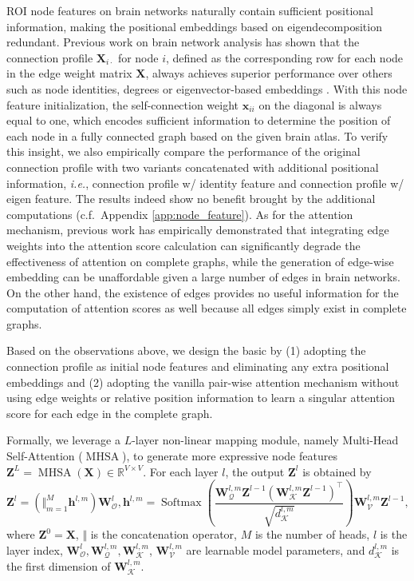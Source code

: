 ROI node features on brain networks naturally contain sufficient positional information, making the positional embeddings based on eigendecomposition redundant. Previous work on brain network analysis has shown that the connection profile $\bm X_{i\cdot}$ for node $i$, defined as the corresponding row for each node in the edge weight matrix $\bm X$, always achieves superior performance over others such as node identities, degrees or eigenvector-based embeddings \citep{li2020braingnn, kan2022fbnetgen, braingb}. With this node feature initialization, the self-connection weight $\bm x_{ii}$ on the diagonal is always equal to one, which encodes sufficient information to determine the position of each node in a fully connected graph based on the given brain atlas.
To verify this insight, we also empirically compare the performance of the original connection profile with two variants concatenated with additional positional information, \textit{i.e.}, connection profile w/ identity feature and connection profile w/ eigen feature. The results indeed show no benefit brought by the additional computations (c.f.~Appendix \ref{app:node_feature}).
As for the attention mechanism, previous work \citep{braingb} has empirically demonstrated that integrating edge weights into the attention score calculation can significantly degrade the effectiveness of attention on complete graphs, while the generation of edge-wise embedding can be unaffordable given a large number of edges in brain networks. On the other hand, the existence of edges provides no useful information for the computation of attention scores as well because all edges simply exist in complete graphs.

Based on the observations above, we design the basic \methodfull by (1) adopting the connection profile as initial node features and eliminating any extra positional embeddings and (2) adopting the vanilla pair-wise attention mechanism without using edge weights or relative position information to learn a singular attention score for each edge in the complete graph.

Formally, we leverage a $L$-layer non-linear mapping module, namely Multi-Head Self-Attention ($\operatorname{MHSA}$), to generate more expressive node features $\bm Z^L = \operatorname{MHSA}(\bm X) \in \mathbb{R}^{V \times V}$. For each layer $l$, the output $\bm Z^{l}$ is obtained by
\begin{equation}
\bm Z^{l} = (\Vert_{m=1}^{M}{\bm h^{l,m}})\bm W^l_{\mathcal{O}},
\text {} \bm h^{l,m} =\operatorname{Softmax}\left(\frac{\bm W_{\mathcal{Q}}^{l, m} \bm Z^{l-1} (\bm W_{\mathcal{K}}^{l, m} \bm Z^{l-1})^{\top}}{\sqrt{d_{\mathcal{K}}^{l, m}}}\right) \bm W_{\mathcal{V}}^{l, m} \bm Z^{l-1},
\end{equation}
where $\bm Z^0 = \bm X$, $\Vert$ is the concatenation operator, $M$ is the number of heads, $l$ is the layer index, $\bm W^l_{\mathcal{O}}, \bm W_{\mathcal{Q}}^{l, m}, \bm W_{\mathcal{K}}^{l, m}$, $\bm W_{\mathcal{V}}^{l, m}$ are learnable model parameters, and $d_{\mathcal{K}}^{l, m}$ is the first dimension of $\bm W_{\mathcal{K}}^{l, m}$.

